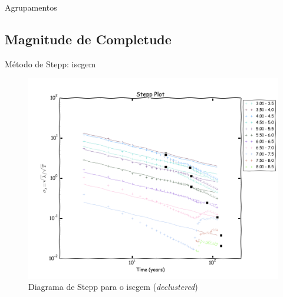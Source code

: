 \documentclass[ucs,8pt]{beamer}
\begin{document}
\begin{frame}{Agrupamentos}
\begin{figure}[H]
\begin{subfigure}[t]{0.50\textwidth}
			\label{fig:br_decluster}
    \end{subfigure}%
	\label{fig:eq_decluster}
\end{figure}
\end{frame}



\subsection{Magnitude de Completude}

\begin{frame}{Método de Stepp: \gls{iscgem}}
\begin{figure}[H]
	\centering
	\includegraphics[height=0.90\textheight]{stepp_sa}
	\caption{Diagrama de Stepp para o \gls{iscgem} (\emph{declustered})}
	\label{fig:sa_stepp}
\end{figure}
\end{frame}
\end{document}
